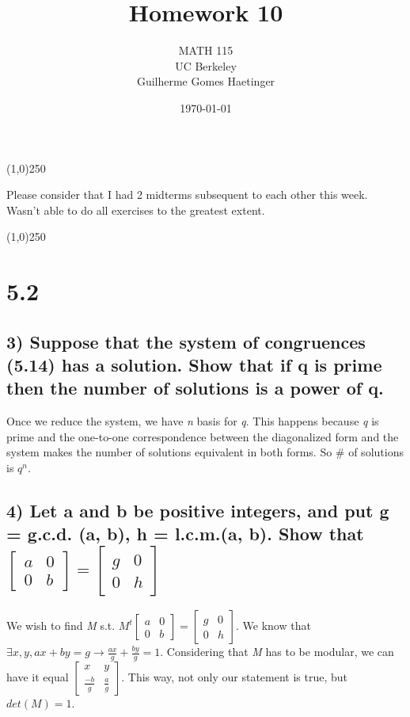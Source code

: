 \documentclass[11pt]{article}
\author{MATH 115 \\ UC Berkeley \\ Guilherme Gomes Haetinger}
\date{\today}
\title{Homework 10}
\begin{document}
\maketitle
\begin{center}
\line(1,0){250}
\end{center}

Please consider that I had 2 midterms subsequent to each other this week. Wasn't able to do all exercises to the greatest extent.

\begin{center}
\line(1,0){250}
\end{center}

\section*{5.2}
\label{sec:orgd9e28ef}

\subsection*{3) Suppose that the system of congruences (5.14) has a solution. Show that if q is prime then the number of solutions is a power of q.}
\label{sec:orgad135fa}

Once we reduce the system, we have \emph{n} basis for \emph{q}. This happens because \emph{q} is prime and the one-to-one correspondence between the diagonalized form and the system makes the number of solutions equivalent in both forms. So \# of solutions is \(q^n\).

\subsection*{4) Let a and b be positive integers, and put g = g.c.d. (a, b), h = l.c.m.(a, b). Show that \(\begin{bmatrix}a & 0 \\ 0 & b\end{bmatrix} = \begin{bmatrix}g & 0 \\ 0 & h\end{bmatrix}\)}
\label{sec:org041a5f9}

We wish to find \emph{M} s.t. \(M^t\begin{bmatrix}a & 0 \\ 0 & b\end{bmatrix} = \begin{bmatrix}g & 0 \\ 0 & h \end{bmatrix}\). We know that \(\exists x,y, ax + by = g \to \frac{ax}{g} + \frac{by}{g} = 1\). Considering that \emph{M} has to be modular, we can have it equal \(\begin{bmatrix}x & y \\ \frac{-b}{g} & \frac{a}{g}\end{bmatrix}\). This way, not only our statement is true, but \(det(M) = 1\).
\end{document}
